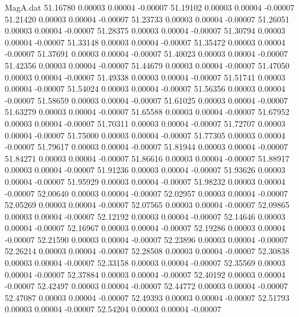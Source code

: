 \begin{filecontents}{MagA.dat}
  51.16780    0.00003    0.00004   -0.00007
  51.19102    0.00003    0.00004   -0.00007
  51.21420    0.00003    0.00004   -0.00007
  51.23733    0.00003    0.00004   -0.00007
  51.26051    0.00003    0.00004   -0.00007
  51.28375    0.00003    0.00004   -0.00007
  51.30794    0.00003    0.00004   -0.00007
  51.33148    0.00003    0.00004   -0.00007
  51.35472    0.00003    0.00004   -0.00007
  51.37691    0.00003    0.00004   -0.00007
  51.40023    0.00003    0.00004   -0.00007
  51.42356    0.00003    0.00004   -0.00007
  51.44679    0.00003    0.00004   -0.00007
  51.47050    0.00003    0.00004   -0.00007
  51.49338    0.00003    0.00004   -0.00007
  51.51741    0.00003    0.00004   -0.00007
  51.54024    0.00003    0.00004   -0.00007
  51.56356    0.00003    0.00004   -0.00007
  51.58659    0.00003    0.00004   -0.00007
  51.61025    0.00003    0.00004   -0.00007
  51.63279    0.00003    0.00004   -0.00007
  51.65588    0.00003    0.00004   -0.00007
  51.67952    0.00003    0.00004   -0.00007
  51.70311    0.00003    0.00004   -0.00007
  51.72707    0.00003    0.00004   -0.00007
  51.75000    0.00003    0.00004   -0.00007
  51.77305    0.00003    0.00004   -0.00007
  51.79617    0.00003    0.00004   -0.00007
  51.81944    0.00003    0.00004   -0.00007
  51.84271    0.00003    0.00004   -0.00007
  51.86616    0.00003    0.00004   -0.00007
  51.88917    0.00003    0.00004   -0.00007
  51.91236    0.00003    0.00004   -0.00007
  51.93626    0.00003    0.00004   -0.00007
  51.95929    0.00003    0.00004   -0.00007
  51.98232    0.00003    0.00004   -0.00007
  52.00640    0.00003    0.00004   -0.00007
  52.02957    0.00003    0.00004   -0.00007
  52.05269    0.00003    0.00004   -0.00007
  52.07565    0.00003    0.00004   -0.00007
  52.09865    0.00003    0.00004   -0.00007
  52.12192    0.00003    0.00004   -0.00007
  52.14646    0.00003    0.00004   -0.00007
  52.16967    0.00003    0.00004   -0.00007
  52.19286    0.00003    0.00004   -0.00007
  52.21590    0.00003    0.00004   -0.00007
  52.23896    0.00003    0.00004   -0.00007
  52.26214    0.00003    0.00004   -0.00007
  52.28508    0.00003    0.00004   -0.00007
  52.30838    0.00003    0.00004   -0.00007
  52.33158    0.00003    0.00004   -0.00007
  52.35569    0.00003    0.00004   -0.00007
  52.37884    0.00003    0.00004   -0.00007
  52.40192    0.00003    0.00004   -0.00007
  52.42497    0.00003    0.00004   -0.00007
  52.44772    0.00003    0.00004   -0.00007
  52.47087    0.00003    0.00004   -0.00007
  52.49393    0.00003    0.00004   -0.00007
  52.51793    0.00003    0.00004   -0.00007
  52.54204    0.00003    0.00004   -0.00007

\end{filecontents}
